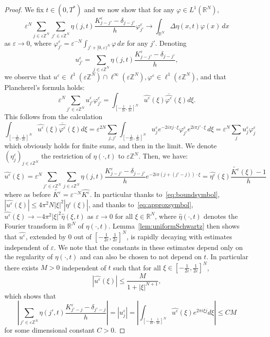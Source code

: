 \documentclass[10pt]{amsart}
\theoremstyle{plain}
\theoremstyle{definition}
\newcommand{\R}{\mathbb{R}}
\newcommand{\Z}{\mathbb{Z}}
\newcommand{\e}{\varepsilon}
\newcommand{\ez}{\e\Z^N}
\numberwithin{equation}{section}
\begin{document}
\begin{proof}
We fix $t\in (0,T^*)$ and we now show that for any $\varphi\in L^1(\R^N)$,
\begin{equation}\label{eq:weakconv}
  \e^N \sum_{j\in\e\Z^N} \sum_{j'\in\e \Z^N} \eta(j,t)  \frac{K^\e_{j-j'}-\delta_{j-j'}}{h}\varphi^\e_{j'}
  \to \int_{\R^N} \Delta \eta (x,t)\varphi(x) \,dx
\end{equation}
as $\e\to 0$, where $\varphi^\e_{j'} = \e^{-N}\int_{j'+[0,\e)^N} \varphi\,dx$ for any $j'$.
Denoting 
\[
u^\e_{j'}= \sum_{j\in\e\Z^N}  \eta(j,t)  \frac{K^\e_{j-j'}-\delta_{j-j'}}{h},
\]
we observe that $u^\e\in \ell^1(\ez)\cap \ell^\infty(\ez),\varphi^\e\in \ell^1(\e\Z^N)$, and that
Plancherel's formula holds:
\[
  \e^N \sum_{j'\in\e\Z^N} u^\e_{j'} \varphi^\e_{j'} = \int_{[-\frac{1}{2\e},\frac{1}{2\e}]^N}
  \widehat{u^\e}(\xi) \overline{\widehat{\varphi^\e}}(\xi) d\xi.
\]
This follows from the calculation
\[
   \int_{  {[-\frac{1}{2\e},\frac{1}{2\e}]^N}}
   \widehat{u^\e}(\xi) \overline{\widehat{\varphi^\e}}(\xi) d\xi
   = \e^{2N} \sum_{j,j'}\int_{[-\frac{1}{2\e},\frac{1}{2\e}]^N} u^\e_j e^{-2i\pi j\cdot \xi} \varphi^\e_{j'}e^{2i\pi j'\cdot\xi}\,d\xi
   = \e^N\sum_j u^\e_j \varphi^\e_j
 \]
 which obviously holds for finite sums, and then in the limit. 
 We denote $(\eta^\e_j)_{j\in\e\Z^N}$ the restriction of $\eta(\cdot,t)$ to  $\e\Z^N$.
 Then, we have:
 \[
   \widehat{u^\e}(\xi) = \e^N\sum_{j'\in\e\Z^N}\sum_{j\in\e\Z^N} \eta(j,t)\frac{K^\e_{j-j'}-\delta_{j-j'}}{h}
   e^{-2 i\pi (j+(j'-j))\cdot\xi}
   = \widehat{\eta^\e}(\xi) \frac{\widetilde{K^\e}(\xi)-1}{h}
 \]
 where as before $\widetilde{K^\e} = \e^{-N}\widehat{K^\e}$.
 In particular thanks to~\eqref{eq:boundsymbol}, $|\widehat{u^\e}(\xi)|\le 4\pi^2 N|\xi|^2|\widehat{\eta^\e}(\xi)|$, and  thanks to~\eqref{eq:approxsymbol},
 $\widehat{u^\e}(\xi)\to -4\pi^2|\xi|^2\widehat{\eta}(\xi,t)$ as $\e\to 0$ for all $\xi\in\R^N$,
where $\widehat{\eta}(\cdot,t)$ denotes the Fourier transform in $\R^N$ of $\eta(\cdot,t)$.
 Lemma~\ref{lem:uniformSchwartz} then shows that $\widehat{u^\e}$, extended by
 $0$ out of $[-\frac{1}{2\e},\frac{1}{2\e}]^N$, is rapidly decaying with estimates
 independent of $\e$. We note that the constants in these estimates depend
 only on the regularity of $\eta(\cdot,t)$ and can also be chosen to not depend on $t$.
In particular there exists $M>0$ independent of $t$ such that for all $\xi\in[-\frac{1}{2\e},\frac{1}{2\e}]^N$,
 \[
   |\widehat{u^\e}(\xi)|\le \frac{M}{1+|\xi|^{N+1}},
 \]
 which shows that
 \begin{equation}\label{eq:boundetaK}
\left|\sum_{j'\in\e\Z^N}  \eta(j',t)  \frac{K^\e_{j'-j}-\delta_{j'-j}}{h}\right|
=
   |u_j^\e| = \left|\int_{[-\frac{1}{2\e},\frac{1}{2\e}]^N} \widehat{u^\e}(\xi)e^{2\pi i \xi\dot j}d\xi
   \right|\le CM
   \end{equation}
   for some dimensional constant $C>0$.


\end{proof}
\end{document}
